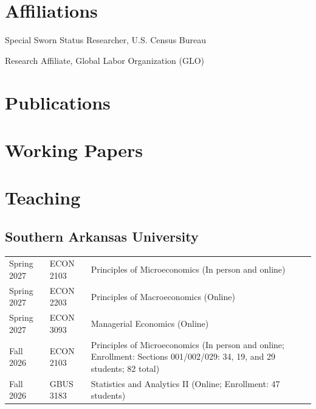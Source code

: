 \documentclass[12pt,letterpaper]{report}
\begin{document}
\section*{Affiliations}
\begin{tablist}
\item[2025--] \tab{}Special Sworn Status Researcher, U.S. Census Bureau
\item[2025--] \tab{}Research Affiliate, Global Labor Organization (GLO)
\end{tablist}
    
\section*{Publications}
\begin{tablist}
\item {}
\item {}
\item {}
\end{tablist}
\section*{Working Papers}
\begin{tablist}
\item {}
\item {}
\item {}	
\item {}
\item {}	
\end{tablist}


\section*{Teaching}
    \subsection*{Southern Arkansas University}
\begin{tabular}{@{}p{3.0cm}p{2.4cm}p{8.6cm}@{}}
Spring 2027 & ECON 2103 & Principles of Microeconomics (In person and online) \\
Spring 2027 & ECON 2203 & Principles of Macroeconomics (Online) \\
Spring 2027 & ECON 3093 & Managerial Economics (Online) \\
Fall 2026 & ECON 2103 & Principles of Microeconomics (In person and online; Enrollment: Sections 001/002/029: 34, 19, and 29 students; 82 total) \\
Fall 2026 & GBUS 3183 & Statistics and Analytics II (Online; Enrollment: 47 students) \\
\end{tabular}
\end{document}
